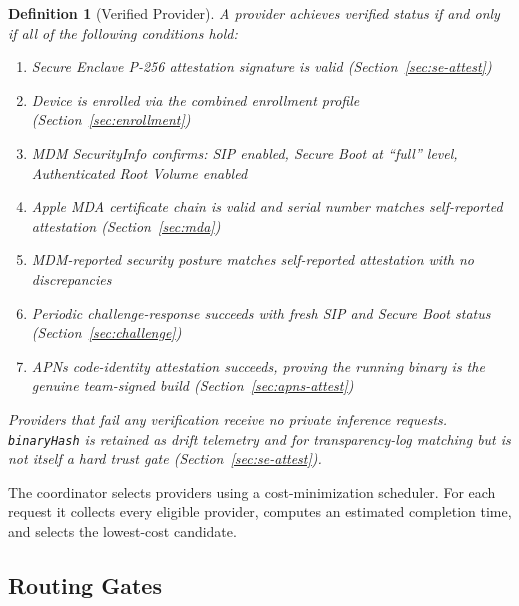 \documentclass[10pt,twocolumn,letterpaper]{article}
\newtheorem{definition}{Definition}
\begin{document}
\begin{definition}[Verified Provider]
A provider achieves \emph{verified} status if and only if all of the following conditions hold:
\begin{enumerate}[leftmargin=*,itemsep=1pt]
    \item Secure Enclave P-256 attestation signature is valid (Section~\ref{sec:se-attest})
    \item Device is enrolled via the combined enrollment profile (Section~\ref{sec:enrollment})
    \item MDM SecurityInfo confirms: SIP enabled, Secure Boot at ``full'' level, Authenticated Root Volume enabled
    \item Apple MDA certificate chain is valid and serial number matches self-reported attestation (Section~\ref{sec:mda})
    \item MDM-reported security posture matches self-reported attestation with no discrepancies
    \item Periodic challenge-response succeeds with fresh SIP and Secure Boot status (Section~\ref{sec:challenge})
    \item APNs code-identity attestation succeeds, proving the running binary is the genuine team-signed build (Section~\ref{sec:apns-attest})
\end{enumerate}
Providers that fail any verification receive no private inference requests. \texttt{binaryHash} is retained as drift telemetry and for transparency-log matching but is not itself a hard trust gate (Section~\ref{sec:se-attest}).
\end{definition}

The coordinator selects providers using a cost-minimization scheduler. For each request it collects every eligible provider, computes an estimated completion time, and selects the lowest-cost candidate.

\subsection{Routing Gates}
\end{document}
